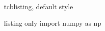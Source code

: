 \documentclass[aspectratio=169,11pt,t]{beamer}
\begin{document}
\begin{frame}[fragile]{tcblisting, default style}
\begin{tcblisting}{listing only}
import numpy as np
\end{tcblisting}
\end{frame}
\end{document}
